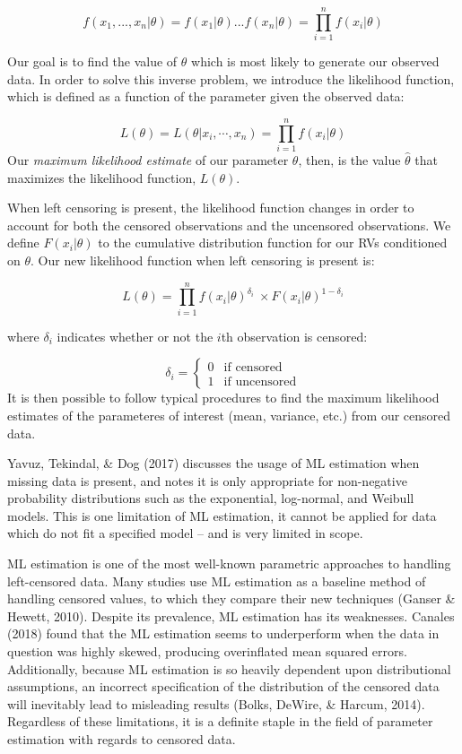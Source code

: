 \documentclass[12pt, twoside]{amherstthesis}
\begin{document}
\[f(x_1,...,x_n|\theta) = f(x_1|\theta)...f(x_n|\theta) = \prod_{i=1}^{n}f(x_i|\theta)\]

Our goal is to find the value of \(\theta\) which is most likely to generate our observed data. In order to solve this inverse problem, we introduce the likelihood function, which is defined as a function of the parameter given the observed data:

\[L(\theta) = L(\theta|x_i, \cdots, x_n) = \prod_{i=1}^{n}f(x_i|\theta)\]
Our \emph{maximum likelihood estimate} of our parameter \(\theta\), then, is the value \(\hat{\theta}\) that maximizes the likelihood function, \(L(\theta)\).

When left censoring is present, the likelihood function changes in order to account for both the censored observations and the uncensored observations. We define \(F(x_i|\theta)\) to the cumulative distribution function for our RVs conditioned on \(\theta\). Our new likelihood function when left censoring is present is:

\[L(\theta) = \prod_{i=1}^n f(x_i|\theta)^{\delta_{i}} \ \times F(x_i|\theta)^{1-{\delta_{i}}}\]

\noindent where \(\delta_{i}\) indicates whether or not the \(i\)th observation is censored:

\[\delta_i =
\begin{cases}
  0 & \text{if censored} \\
  1 & \text{if uncensored}
\end{cases}\]
It is then possible to follow typical procedures to find the maximum likelihood estimates of the parameteres of interest (mean, variance, etc.) from our censored data.

Yavuz, Tekindal, \& Dog (2017) discusses the usage of ML estimation when missing data is present, and notes it is only appropriate for non-negative probability distributions such as the exponential, log-normal, and Weibull models. This is one limitation of ML estimation, it cannot be applied for data which do not fit a specified model -- and is very limited in scope.

ML estimation is one of the most well-known parametric approaches to handling left-censored data. Many studies use ML estimation as a baseline method of handling censored values, to which they compare their new techniques (Ganser \& Hewett, 2010). Despite its prevalence, ML estimation has its weaknesses. Canales (2018) found that the ML estimation seems to underperform when the data in question was highly skewed, producing overinflated mean squared errors. Additionally, because ML estimation is so heavily dependent upon distributional assumptions, an incorrect specification of the distribution of the censored data will inevitably lead to misleading results (Bolks, DeWire, \& Harcum, 2014). Regardless of these limitations, it is a definite staple in the field of parameter estimation with regards to censored data.
\end{document}
